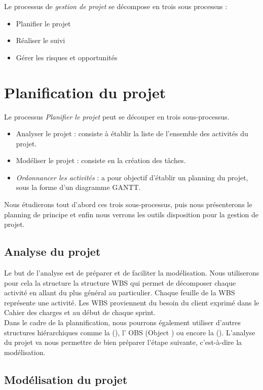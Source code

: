 Le processus de \textit{gestion de projet} se décompose en trois sous processus : 
\begin{itemize}
\item Planifier le projet
\item Réaliser le suivi
\item Gérer les risques et opportunités
\end{itemize}

\section{Planification du projet}

Le processus \textit{Planifier le projet} peut se découper en trois sous-processus.

\begin{itemize}
\item Analyser le projet : consiste à établir la liste de l'ensemble des activités du projet.
\item Modéliser le projet : consiste en la création des tâches.
\item \textit{Ordonnancer les activités} : a pour objectif d'établir un planning du projet, sous la forme d'un diagramme GANTT.
\end{itemize}

Nous étudierons tout d'abord ces trois sous-processus, puis nous présenterons le planning de principe et enfin nous verrons les outils  disposition pour la gestion de projet. 

\subsection{Analyse du projet}
Le but de l'analyse est de préparer et de faciliter la modélisation. Nous utiliserons pour cela la structure la structure WBS qui permet de décomposer chaque activité en allant du plus général au particulier. Chaque feuille de la WBS représente une activité. Les WBS proviennent du besoin du client exprimé dans le Cahier des charges et au début de chaque sprint. \\

Dans le cadre de la plannification, nous pourrons également utiliser d’autres structures hiérarchiques comme la \FBSCourt (\FBS), l’ OBS (Object \BS) ou encore la \RBSCourt (\RBS). L’analyse du projet va nous permettre de bien préparer l’étape suivante, c’est-à-dire la modélisation.


\subsection{Modélisation du projet}

